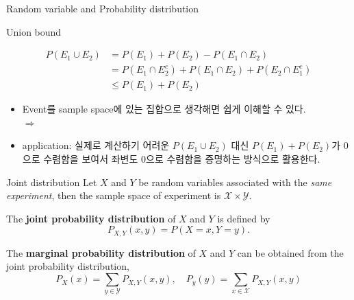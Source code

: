 \documentclass[9pt]{beamer}
\begin{document}
\begin{section}{Random variable and Probability distribution}
      \begin{frame}{Union bound}
        \begin{theorem}
          \vspace{-0.5cm}
          \begin{align*} P(E_1 \cup E_2) &= P(E_1) + P(E_2) - P(E_1 \cap E_2)  \\ &= P(E_1 \cap E_2^c) + P(E_1\cap E_2) + P(E_2 \cap E_1^c) \\ &\le P(E_1) + P(E_2)\end{align*}
        \end{theorem}
        \begin{itemize}
          \item Event를 sample space에 있는 집합으로 생각해면 쉽게 이해할 수 있다.
          \\ $\Rightarrow$
          \vspace{1.5cm}
          \item application: 실제로 계산하기 어려운 $P(E_1 \cup E_2)$ 대신 $P(E_1) + P(E_2)$가 0으로 수렴함을 보여서 좌변도 0으로 수렴함을 증명하는 방식으로 활용한다.
        \end{itemize}
      \end{frame}

      \begin{frame}{Joint distribution}
        Let $X$ and $Y$ be random variables associated with the \textit{same experiment}, then the sample space of experiment is $\mathcal X \times \mathcal Y$.
        \begin{definition}
        The \textbf{joint probability distribution} of $X$ and $Y$ is defined by 
        $$P_{X, Y}(x,y) = P(X=x, Y=y).$$
        \end{definition}
        \begin{definition}[marginalization]
        The \textbf{marginal probability distribution} of $X$ and $Y$ can be obtained from the joint probability distribution,
        $$ P_X(x) = \sum_{y \in \mathcal Y} P_{X, Y}(x, y),\quad  P_y(y) = \sum_{x \in \mathcal X} P_{X, Y}(x, y)$$
        \end{definition}
      \end{frame}


\end{section}
\end{document}
